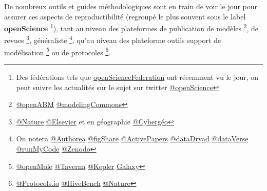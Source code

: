 De nombreux outils et guides méthodologiques \autocite{Prlic2012} \autocite{Bourne2013} \autocite{Goodman2014} \autocite{Sandve2013} sont en train de voir le jour pour assurer ces aspects de reproductibilité (regroupé le plus souvent sous le label \textbf{openScience} \footnote{Des fédérations tels que \href{http://opensciencefederation.com/}{openScienceFederation} ont récemment vu le jour, on peut suivre les actualités sur le sujet sur twitter \href{https://twitter.com/openscience}{@openScience}}), tant au niveau des plateformes de publication de modèles 
\footnote{\href{http://www.openabm.org/}{@openABM} \href{http://modelingcommons.org}{@modelingCommons}}, de revues 
\footnote{\href{http://www.nature.com/scientificdata/about/}{@Nature} \href{http://www.elsevier.com/physical-sciences/computer-science/executable-papers}{@Elsevier} et en géographie \href{http://cybergeo.revues.org/}{@Cybergéo}}, généraliste 
\footnote{On notera \href{https://authorea.com/}{@Authorea} \href{http://figshare.com/}{@figShare} \href{http://www.activepapers.org/}{@ActivePapers} \href{http://datadryad.org/}{@dataDryad} \href{http://http://thedata.org/}{@dataVerse} \href{http://www.runmycode.org/}{@runMyCode} \href{http://zenodo.org/}{@Zenodo}}, qu'au niveau des plateforme outils support de modélisation 
\footnote{\href{http://www.openmole.org/}{@openMole} \href{http://www.taverna.org.uk/}{@Taverna} \href{https://kepler-project.org/}{@Kepler} \href{http://galaxyproject.org/}{Galaxy}} ou de protocoles 
\footnote{\href{http://www.protocols.io/}{@Protocols.io} \href{https://www.hivebench.com/}{@HiveBench} \href{http://www.nature.com/protocolexchange}{@Nature}}. 




